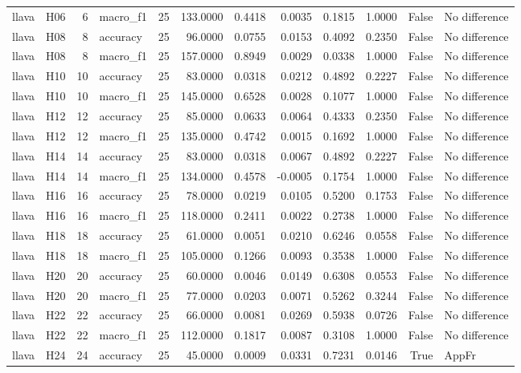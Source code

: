 \begin{table}[tbp]
\begin{tabular}{llrlrrrrrrrl}
llava & H06 & 6 & macro\_f1 & 25 & 133.0000 & 0.4418 & 0.0035 & 0.1815 & 1.0000 & False & No difference \\
llava & H08 & 8 & accuracy & 25 & 96.0000 & 0.0755 & 0.0153 & 0.4092 & 0.2350 & False & No difference \\
llava & H08 & 8 & macro\_f1 & 25 & 157.0000 & 0.8949 & 0.0029 & 0.0338 & 1.0000 & False & No difference \\
llava & H10 & 10 & accuracy & 25 & 83.0000 & 0.0318 & 0.0212 & 0.4892 & 0.2227 & False & No difference \\
llava & H10 & 10 & macro\_f1 & 25 & 145.0000 & 0.6528 & 0.0028 & 0.1077 & 1.0000 & False & No difference \\
llava & H12 & 12 & accuracy & 25 & 85.0000 & 0.0633 & 0.0064 & 0.4333 & 0.2350 & False & No difference \\
llava & H12 & 12 & macro\_f1 & 25 & 135.0000 & 0.4742 & 0.0015 & 0.1692 & 1.0000 & False & No difference \\
llava & H14 & 14 & accuracy & 25 & 83.0000 & 0.0318 & 0.0067 & 0.4892 & 0.2227 & False & No difference \\
llava & H14 & 14 & macro\_f1 & 25 & 134.0000 & 0.4578 & -0.0005 & 0.1754 & 1.0000 & False & No difference \\
llava & H16 & 16 & accuracy & 25 & 78.0000 & 0.0219 & 0.0105 & 0.5200 & 0.1753 & False & No difference \\
llava & H16 & 16 & macro\_f1 & 25 & 118.0000 & 0.2411 & 0.0022 & 0.2738 & 1.0000 & False & No difference \\
llava & H18 & 18 & accuracy & 25 & 61.0000 & 0.0051 & 0.0210 & 0.6246 & 0.0558 & False & No difference \\
llava & H18 & 18 & macro\_f1 & 25 & 105.0000 & 0.1266 & 0.0093 & 0.3538 & 1.0000 & False & No difference \\
llava & H20 & 20 & accuracy & 25 & 60.0000 & 0.0046 & 0.0149 & 0.6308 & 0.0553 & False & No difference \\
llava & H20 & 20 & macro\_f1 & 25 & 77.0000 & 0.0203 & 0.0071 & 0.5262 & 0.3244 & False & No difference \\
llava & H22 & 22 & accuracy & 25 & 66.0000 & 0.0081 & 0.0269 & 0.5938 & 0.0726 & False & No difference \\
llava & H22 & 22 & macro\_f1 & 25 & 112.0000 & 0.1817 & 0.0087 & 0.3108 & 1.0000 & False & No difference \\
llava & H24 & 24 & accuracy & 25 & 45.0000 & 0.0009 & 0.0331 & 0.7231 & 0.0146 & True & AppFr \\

\end{tabular}
\end{table}
